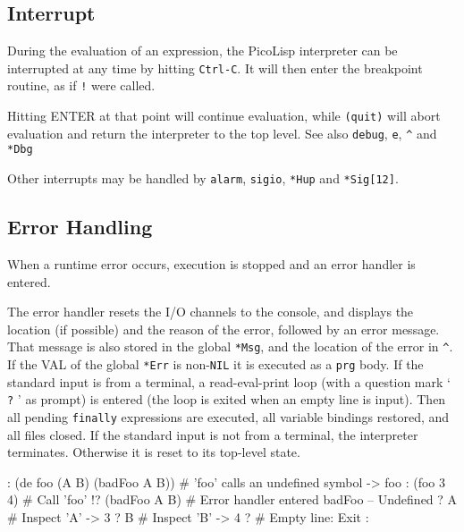  
\subsection{Interrupt}
\label{sec:refm-interrupt}


During the evaluation of an expression, the PicoLisp interpreter can be
interrupted at any time by hitting \texttt{Ctrl-C}. It will then enter the
breakpoint routine, as if \texttt{!} were called.

Hitting ENTER at that point will continue evaluation, while \texttt{(quit)}
will abort evaluation and return the interpreter to the top level. See
also \texttt{debug}, \texttt{e}, \texttt{\textasciicircum{}} and \texttt{*Dbg}

Other interrupts may be handled by \texttt{alarm}, \texttt{sigio}, \texttt{*Hup} and
\texttt{*Sig[12]}.

 

 
\subsection{Error Handling}
\label{sec:refm-error-handling}


When a runtime error occurs, execution is stopped and an error handler
is entered.

The error handler resets the I/O channels to the console, and displays
the location (if possible) and the reason of the error, followed by an
error message. That message is also stored in the global \texttt{*Msg}, and the
location of the error in \texttt{\textasciicircum{}}. If the VAL of the global \texttt{*Err} is
non-\texttt{NIL} it is executed as a \texttt{prg} body. If the standard input is from
a terminal, a read-eval-print loop (with a question mark ` \texttt{?} ' as
prompt) is entered (the loop is exited when an empty line is input).
Then all pending \texttt{finally} expressions are executed, all variable
bindings restored, and all files closed. If the standard input is not
from a terminal, the interpreter terminates. Otherwise it is reset to
its top-level state.


\begin{wideverbatim}
: (de foo (A B) (badFoo A B))       # 'foo' calls an undefined symbol
-> foo
: (foo 3 4)                         # Call 'foo'
!? (badFoo A B)                     # Error handler entered
badFoo -- Undefined
? A                                 # Inspect 'A'
-> 3
? B                                 # Inspect 'B'
-> 4
?                                   # Empty line: Exit
:
\end{wideverbatim}

